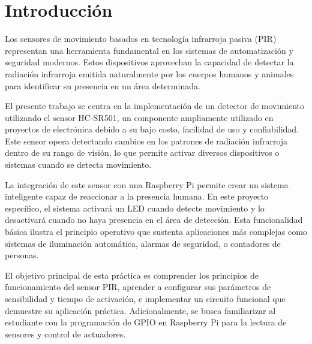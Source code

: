 \section{Introducción}
\noindent
\justifying
Los sensores de movimiento basados en tecnología infrarroja pasiva (PIR) representan una herramienta fundamental en los sistemas de automatización y seguridad modernos. Estos dispositivos aprovechan la capacidad de detectar la radiación infrarroja emitida naturalmente por los cuerpos humanos y animales para identificar su presencia en un área determinada.

El presente trabajo se centra en la implementación de un detector de movimiento utilizando el sensor HC-SR501, un componente ampliamente utilizado en proyectos de electrónica debido a su bajo costo, facilidad de uso y confiabilidad. Este sensor opera detectando cambios en los patrones de radiación infrarroja dentro de su rango de visión, lo que permite activar diversos dispositivos o sistemas cuando se detecta movimiento.

La integración de este sensor con una Raspberry Pi permite crear un sistema inteligente capaz de reaccionar a la presencia humana. En este proyecto específico, el sistema activará un LED cuando detecte movimiento y lo desactivará cuando no haya presencia en el área de detección. Esta funcionalidad básica ilustra el principio operativo que sustenta aplicaciones más complejas como sistemas de iluminación automática, alarmas de seguridad, o contadores de personas.

El objetivo principal de esta práctica es comprender los principios de funcionamiento del sensor PIR, aprender a configurar sus parámetros de sensibilidad y tiempo de activación, e implementar un circuito funcional que demuestre su aplicación práctica. Adicionalmente, se busca familiarizar al estudiante con la programación de GPIO en Raspberry Pi para la lectura de sensores y control de actuadores.